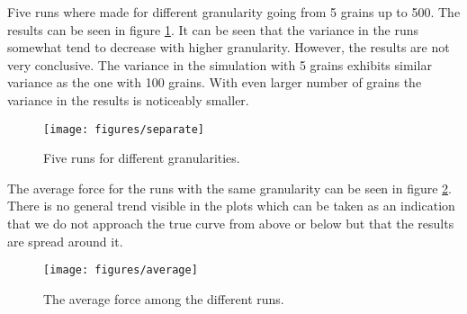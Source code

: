 \documentclass[convergence.tex]{subfiles}
\begin{document}
Five runs where made for different granularity going from 5 grains up to 500. The results can be seen in figure \ref{fig:separate}. It can be seen that the variance in the runs somewhat tend to decrease with higher granularity. However, the results are not very conclusive. The variance in the simulation with 5 grains exhibits similar variance as the one with 100 grains. With even larger number of grains the variance in the results is noticeably smaller. 

\begin{figure}[ht]
\centering
\texttt{[image: figures/separate]}
\caption{Five runs for different granularities.}
\label{fig:separate}
\end{figure}


The average force for the runs with the same granularity can be seen in figure \ref{fig:average}. There is no general trend visible in the plots which can be taken as an indication that we do not approach the true curve from above or below but that the results are spread around it.


\begin{figure}[ht]
\centering
\texttt{[image: figures/average]}
\caption{The average force among the different runs.}
\label{fig:average}
\end{figure}
\end{document}
